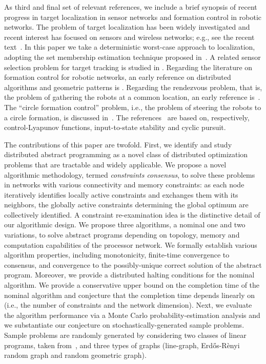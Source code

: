 \documentclass[onecolumn,journal,letterpaper]{IEEEtran}
\begin{document}
As third and final set of relevant references, we include a brief synopsis
of recent progress in target localization in sensor networks and formation
control in robotic networks.  The problem of target localization has been
widely investigated and recent interest has focused on sensors and wireless
networks; e.g., see the recent text~\cite{FZ-LG:04}. In this paper we take
a deterministic worst-case approach to localization, adopting the set
membership estimation technique proposed in~\cite{AG-AV:01}. A related
sensor selection problem for target tracking is studied in \cite{VI-RB:06}.
Regarding the literature on formation control for robotic networks, an
early reference on distributed algorithms and geometric patterns is
\cite{IS-MY:99}.  Regarding the rendezvous problem, that is, the problem of
gathering the robots at a common location, an early reference
is~\cite{HA-YO-IS-MY:99}.  The ``circle formation control'' problem, i.e.,
the problem of steering the robots to a circle formation, is discussed
in~\cite{XD-AK:02}.  The
references~\cite{ME-XH:01b,HGT-GJP-VK:04,JAM-MEB-BAF:04c} are based on,
respectively, control-Lyapunov functions, input-to-state stability and
cyclic pursuit.

The contributions of this paper are twofold.  First, we identify and study
distributed abstract programming as a novel class of distributed
optimization problems that are tractable and widely applicable.  We propose
a novel algorithmic methodology, termed \emph{constraints consensus}, to
solve these problems in networks with various connectivity and memory
constraints: as each node iteratively identifies locally active constraints
and exchanges them with its neighbors, the globally active constraints
determining the global optimum are collectively identified. A constraint
re-examination idea is the distinctive detail of our algorithmic design.
We propose three algorithms, a nominal one and two variations, to solve
abstract programs depending on topology, memory and computation
capabilities of the processor network. We formally establish various algorithm properties, including monotonicity,
finite-time convergence to consensus, and convergence to the
possibly-unique correct solution of the abstract program.  Moreover, we
provide a distributed halting conditions for the nominal algorithm.
We provide a conservative upper bound on the completion time of the nominal
algorithm and conjecture that the completion time depends linearly on 
(i.e., the number of constraints and the network dimension).  Next, we
evaluate the algorithm performance via a Monte Carlo probability-estimation
analysis and we substantiate our conjecture on stochastically-generated
sample problems. Sample problems are randomly generated by considering two
classes of linear programs, taken from~\cite{RS:87}, and three types of
graphs (line-graph, Erd\H{o}s-R\`enyi random graph and random geometric
graph).
\end{document}

